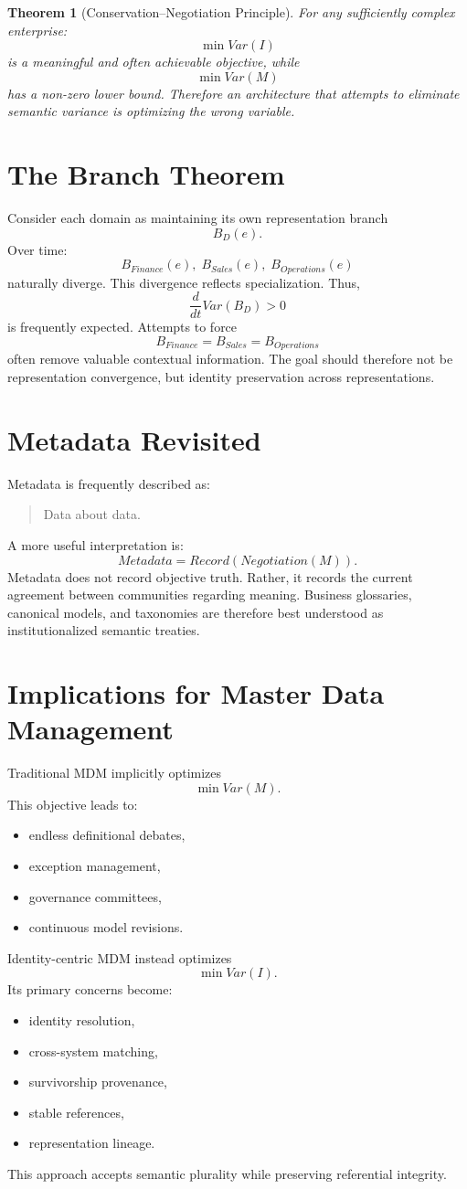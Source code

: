 \documentclass[11pt]{article}
\newtheorem{theorem}{Theorem}
\begin{document}
\begin{theorem}[Conservation--Negotiation Principle]
For any sufficiently complex enterprise:
\[
\min Var(I)
\]
is a meaningful and often achievable objective, while
\[
\min Var(M)
\]
has a non-zero lower bound. Therefore an architecture that attempts to eliminate semantic variance is optimizing the wrong variable.
\end{theorem}

\section{The Branch Theorem}
Consider each domain as maintaining its own representation branch
\[
B_D(e).
\]
Over time:
\[
B_{Finance}(e), \; B_{Sales}(e), \; B_{Operations}(e)
\]
naturally diverge. This divergence reflects specialization. Thus,
\[
\frac{d}{dt}Var(B_D) > 0
\]
is frequently expected. Attempts to force
\[
B_{Finance} = B_{Sales} = B_{Operations}
\]
often remove valuable contextual information. The goal should therefore not be representation convergence, but identity preservation across representations.

\section{Metadata Revisited}
Metadata is frequently described as:
\begin{quote}
Data about data.
\end{quote}
A more useful interpretation is:
\[
Metadata = Record(Negotiation(M)).
\]
Metadata does not record objective truth. Rather, it records the current agreement between communities regarding meaning. Business glossaries, canonical models, and taxonomies are therefore best understood as institutionalized semantic treaties.

\section{Implications for Master Data Management}
Traditional MDM implicitly optimizes
\[
\min Var(M).
\]
This objective leads to:
\begin{itemize}
\item endless definitional debates,
\item exception management,
\item governance committees,
\item continuous model revisions.
\end{itemize}
Identity-centric MDM instead optimizes
\[
\min Var(I).
\]
Its primary concerns become:
\begin{itemize}
\item identity resolution,
\item cross-system matching,
\item survivorship provenance,
\item stable references,
\item representation lineage.
\end{itemize}
This approach accepts semantic plurality while preserving referential integrity.
\end{document}

